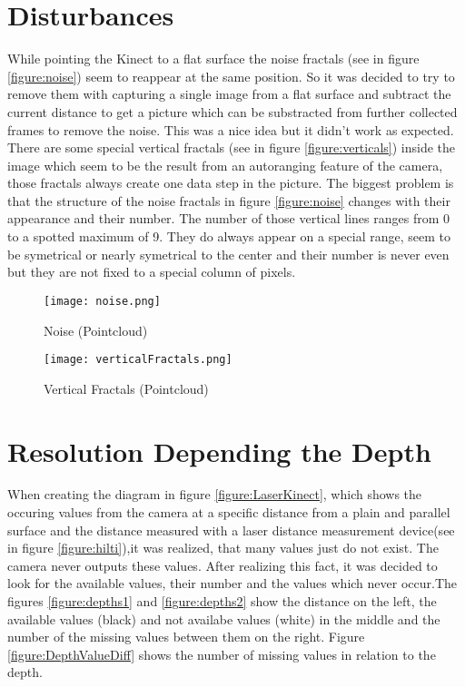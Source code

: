 \section{Disturbances}
While pointing the Kinect to a flat surface the noise fractals (see in figure \vref{figure:noise}) 
seem to reappear at the same position. So it was decided to try to remove them with capturing a single image 
from a flat surface and subtract the current distance to get a picture which can be substracted from further collected
frames to remove the noise. This was a nice idea but it didn't work as expected. 
There are some special vertical fractals (see in figure \vref{figure:verticals}) 
inside the image which seem to be the result from an autoranging feature of the camera, those fractals
always create one data step in the picture. The biggest problem is that the structure of the noise fractals
in figure \vref{figure:noise} changes with their appearance and their number. 
The number of those vertical lines ranges from 0 to a spotted maximum of 9. 
They do always appear on a special range, seem to be symetrical or 
nearly symetrical to the center and their number is never even but they are not fixed to a special column of pixels. 
\begin{figure}[htp]
\begin{center}
  \texttt{[image: noise.png]}
  \caption{Noise (Pointcloud)}
  \label{figure:noise}
\end{center}
\end{figure}

\begin{figure}[htp]
\begin{center}
  \texttt{[image: verticalFractals.png]}
  \caption{Vertical Fractals (Pointcloud)}
  \label{figure:verticals}
\end{center}
\end{figure}

\section{Resolution Depending the Depth} \label{resdepDepth}
When creating the diagram in figure \vref{figure:LaserKinect}, which shows the occuring values from the camera 
at a specific distance from a plain and parallel surface and the distance measured with a laser distance measurement 
device(see in figure \vref{figure:hilti}),it was realized, that many values just do not exist. The camera never outputs 
these values. After realizing this fact, it was decided to look for the available values, their number and the values which 
never occur.The figures \vref{figure:depths1} and \vref{figure:depths2} show the distance on the left, 
the available values (black) and not availabe values (white) in the middle and the number of the missing values between them 
on the right. Figure \vref{figure:DepthValueDiff} shows the number of missing values in relation to the depth.

